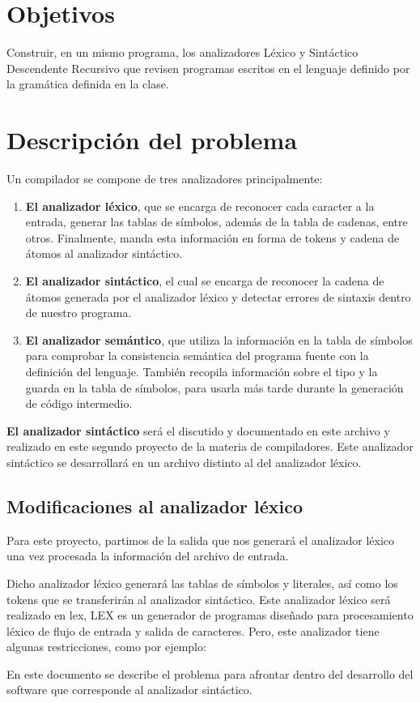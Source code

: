 \documentclass[12pt, a4paper]{article}
\begin{document}
\newpage

\section{Objetivos}
Construir, en un mismo programa, los analizadores Léxico y Sintáctico Descendente Recursivo que revisen programas escritos en el lenguaje definido por la gramática definida en la clase.

\section{Descripción del problema}

Un compilador se compone de tres analizadores principalmente: 

\begin{enumerate}
  \item \textbf{El analizador léxico}, que se encarga de reconocer cada caracter a la entrada, generar las tablas de símbolos, además de la tabla de cadenas, entre otros. Finalmente, manda esta información en forma de tokens y cadena de átomos al analizador sintáctico.
  \item \textbf{El analizador sintáctico}, el cual se encarga de reconocer la cadena de átomos generada por el analizador léxico y detectar errores de sintaxis dentro de nuestro programa.
  \item \textbf{El analizador semántico}, que utiliza la información en la tabla de símbolos para comprobar la consistencia semántica del programa fuente con la definición del lenguaje. También recopila información sobre el tipo y la guarda en la tabla de símbolos, para usarla más tarde durante la generación de código intermedio.
\end{enumerate}

\textbf{El analizador sintáctico} será el discutido y documentado en este archivo y realizado en este segundo proyecto de la materia de compiladores. Este analizador sintáctico se desarrollará en un archivo distinto al del analizador léxico.

\subsection{Modificaciones al analizador léxico}
Para este proyecto, partimos de la salida que nos generará el analizador léxico una vez procesada la información del archivo de entrada.

Dicho analizador léxico generará las tablas de símbolos y literales, así como los tokens que se transferirán al analizador sintáctico. Este analizador léxico será realizado en lex, LEX es un generador de programas diseñado para procesamiento léxico de flujo de entrada y salida de caracteres. Pero, este analizador tiene algunas restricciones, como por ejemplo:\par
En este documento se describe el problema para afrontar dentro del desarrollo del software que corresponde al analizador sintáctico.
\end{document}
